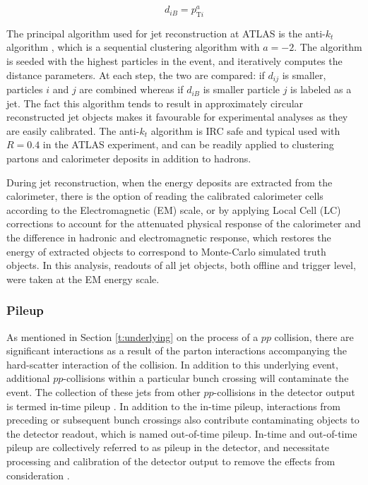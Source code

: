 	\begin{equation}
	d_{iB} = p_{\text{T}i}^a
	\end{equation}

	The principal algorithm used for jet reconstruction at ATLAS is the anti-$k_t$ algorithm \cite{antikt}, which is a sequential clustering algorithm with $a=-2$. The algorithm is seeded with the highest \pt particles in the event, and iteratively computes the distance parameters. At each step, the two are compared: if $d_{ij}$ is smaller, particles $i$ and $j$ are combined whereas if $d_{iB}$ is smaller particle $j$ is labeled as a jet. The fact this algorithm tends to result in approximately circular reconstructed jet objects makes it favourable for experimental analyses as they are easily calibrated. The anti-$k_t$ algorithm is IRC safe and typical used with $R=0.4$ in the ATLAS experiment, and can be readily applied to clustering partons and calorimeter deposits in addition to hadrons.

	During jet reconstruction, when the energy deposits are extracted from the calorimeter, there is the option of reading the calibrated \cite{tilecalib} calorimeter cells according to the Electromagnetic (EM) scale, or by applying Local Cell (LC) corrections \cite{localcell} to account for the attenuated physical response of the calorimeter and the difference in hadronic and electromagnetic response, which restores the energy of extracted objects to correspond to Monte-Carlo simulated truth objects. In this analysis, readouts of all jet objects, both offline and trigger level, were taken at the EM energy scale.

	\subsubsection{Pileup}

	As mentioned in Section \ref{t:underlying} on the process of a $pp$ collision, there are significant interactions as a result of the parton interactions accompanying the hard-scatter interaction of the collision. In addition to this underlying event, additional $pp$-collisions within a particular bunch crossing will contaminate the event. The collection of these jets from other $pp$-collisions in the detector output is termed in-time pileup \cite{simpileup}. In addition to the in-time pileup, interactions from preceding or subsequent bunch crossings also contribute contaminating objects to the detector readout, which is named out-of-time pileup. In-time and out-of-time pileup are collectively referred to as pileup in the detector, and necessitate processing and calibration of the detector output to remove the effects from consideration \cite{pileup}.

